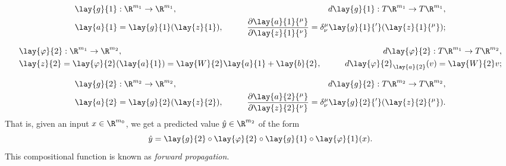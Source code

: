 \begin{align*}
	&\lay{g}{1}:\R^{m_1}\to\R^{m_1},\qquad &
	d\lay{g}{1}:T\R^{m_1}\to T\R^{m_1},\\
	&\lay{a}{1}=\lay{g}{1}(\lay{z}{1}),\qquad
	&\frac{\partial\lay{a}{1}{^\mu}}{\partial \lay{z}{1}{^\nu}}=\delta^\mu_\nu\lay{g}{1}{'}(\lay{z}{1}{^\mu});
\end{align*}

\begin{align*}
&\lay{\varphi}{2}:\R^{m_1}\to\R^{m_2},\qquad
&d\lay{\varphi}{2}:T\R^{m_1}\to T\R^{m_2},\\
&\lay{z}{2}=\lay{\varphi}{2}(\lay{a}{1})=\lay{W}{2}\lay{a}{1}+\lay{b}{2},\qquad &d\lay{\varphi}{2}_{\lay{a}{2}}(v)=\lay{W}{2}v;
\end{align*}

\begin{align*}
	&\lay{g}{2}:\R^{m_2}\to\R^{m_2},\qquad
	&d\lay{g}{2}:T\R^{m_2}\to T\R^{m_2},\\
	&\lay{a}{2}=\lay{g}{2}(\lay{z}{2}),\qquad
	&\frac{\partial\lay{a}{2}{^\mu}}{\partial \lay{z}{2}{^\nu}}=\delta^\mu_\nu\lay{g}{2}{'}(\lay{z}{2}{^\mu}).
\end{align*}
That is, given an input $x\in\R^{m_0}$, we get a predicted value $\hat{y}\in\R^{m_2}$ of the form
$$\hat{y}=\lay{g}{2}\circ\lay{\varphi}{2}\circ\lay{g}{1}\circ\lay{\varphi}{1}(x).$$
This compositional function is known as \textit{forward propagation}.

